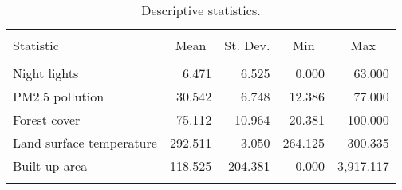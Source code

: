 
\begin{table}[b] \centering 
  \caption{Descriptive statistics.} 
  \label{tab:desc} 
\begin{tabular}{@{\extracolsep{5pt}}lrrrr} 
\\[-1.8ex]\hline 
\hline \\[-1.8ex] 
Statistic & \multicolumn{1}{c}{Mean} & \multicolumn{1}{c}{St. Dev.} & \multicolumn{1}{c}{Min} & \multicolumn{1}{c}{Max} \\ 
\hline \\[-1.8ex] 
Night lights   &  6.471 & 6.525 & 0.000 & 63.000 \\ 
PM2.5 pollution &  30.542 & 6.748 & 12.386 & 77.000 \\ 
Forest cover   &  75.112 & 10.964 & 20.381 & 100.000 \\ 
Land surface temperature   &  292.511 & 3.050 & 264.125 & 300.335 \\ 
Built-up area  &  118.525 & 204.381 & 0.000 & 3,917.117 \\ 
\hline \\[-1.8ex] 
\end{tabular} 
\end{table} 
